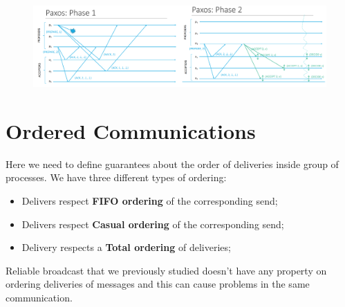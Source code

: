 \documentclass{article}
\begin{document}
\begin{figure}[H]
  \centering
  \includegraphics[scale=0.55]{cattura47.png}
\end{figure}

\section{Ordered Communications}
Here we need to define guarantees about the order of deliveries inside group of processes. We have three different types of ordering:
\begin{itemize}
\item Delivers respect \textbf{FIFO ordering} of the corresponding send;
\item Delivers respect \textbf{Casual ordering} of the corresponding send;
\item Delivery respects a \textbf{Total ordering} of deliveries;
\end{itemize}
Reliable broadcast that we previously studied doesn't have any property on ordering deliveries of messages and this can cause problems in the same communication. 
\end{document}
